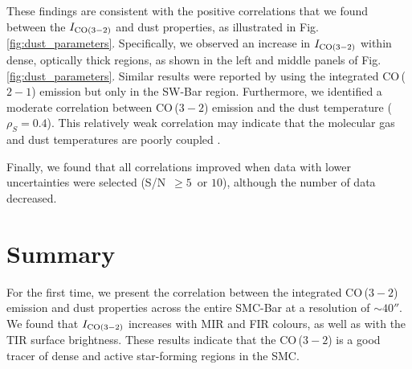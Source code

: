 \documentclass[baaa]{baaa}
\begin{document}
These findings are consistent with the positive correlations that we found between the $I_{{\rm CO}(3-2)}$ and dust properties, as illustrated in Fig. \ref{fig:dust_parameters}. Specifically, we observed an increase in $I_{{\rm CO}(3-2)}$ within dense, optically thick regions, as shown in the left and middle panels of Fig. \ref{fig:dust_parameters}. Similar results were reported by \cite{Lee_2015MNRAS_450_2708L} using the integrated CO\,($2-1$) emission but only in the SW-Bar region. Furthermore, we identified a moderate correlation between CO\,($3-2$) emission and the dust temperature ($\rho_S = 0.4$). This relatively weak correlation may indicate that the molecular gas and dust temperatures are poorly coupled \citep[see ][]{Luo_2023ApJ_942_101L}. 

Finally, we found that all correlations improved when data with lower uncertainties were selected (S/N~$\geq 5$~or $10$), although the number of data decreased. 

\section{Summary}
\label{sec:summary}
For the first time, we present the correlation between the integrated CO\,($3-2$) emission and dust properties across the entire SMC-Bar at a resolution of $\sim 40''$. We found that $I_{{\rm CO}(3-2)}$ increases with MIR and FIR colours, as well as with the TIR surface brightness. These results indicate that the CO\,($3-2$) is a good tracer of dense and active star-forming regions in the SMC.




\small

 
\end{document}
